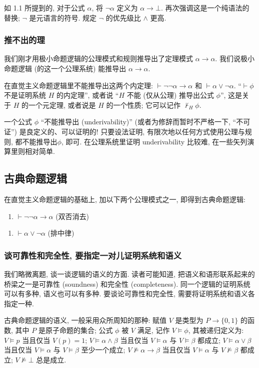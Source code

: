 \documentclass{article}
\def\a{\alpha}
\def\b{\beta}
\begin{document}
如 1.1 所提到的, 对于公式 $\a$, 将 $\neg \a$ 定义为 $\a \to \bot$. 再次强调这是一个纯语法的替换; $\neg$ 是元语言的符号. 规定 $\neg$ 的优先级比 $\land$ 更高.

\subsubsection{推不出的理}

我们刚才用极小命题逻辑的公理模式和规则推导出了定理模式 $\a \to \a$. 我们说极小命题逻辑 (的这一个公理系统) 能推导出 $\a \to \a$. 

在直觉主义命题逻辑里不能推导出这两个内定理: $\vdash \neg \neg \a \to \a$ 和 $\vdash \a \lor \neg \a$. ``$\vdash \phi$ 不是证明系统 $H$ 的内定理'', 或者说 ``$H$ 不能 (仅从公理) 推导出公式 $\phi$'', 这是关于 $H$ 的一个元定理, 或者说是 $H$ 的一个性质; 它可以记作 $\not\vdash_H \phi$. 

一个公式 $\phi$ ``不能推导出 (underivability)'' (或者为修辞而暂时不严格一下, ``不可证'') 是良定义的、可以证明的! 只要设法证明, 有限次地以任何方式使用公理与规则, 都不能推导出$\phi$, 即可. 在公理系统里证明 underivability 比较难, 在一些矢列演算里则相对简单.

\subsection{古典命题逻辑}

在直觉主义命题逻辑的基础上, 加以下两个公理模式之一, 即得到古典命题逻辑:
\begin{enumerate}[start=10]
\item $\vdash \neg \neg \a \to \a$ (双否消去)
\end{enumerate}
\begin{enumerate}[start=10]
\item $\vdash \a \lor \neg \a$ (排中律)
\end{enumerate}

\subsubsection{谈可靠性和完全性, 要指定一对儿证明系统和语义}

我们略微离题, 谈一谈逻辑的语义的方面. 读者可能知道, 把语义和语形联系起来的桥梁之一是可靠性 (soundness) 和完全性 (completeness). 同一个逻辑的证明系统可以有多种, 语义也可以有多种. 要谈论可靠性和完全性, 需要将证明系统和语义各指定一种.

古典命题逻辑的语义, 一般采用众所周知的那种: 赋值 $V$ 是类型为 $P \to \{0,1\}$ 的函数, 其中 $P$ 是原子命题的集合; 公式 $\phi$ 被 $V$ 满足, 记作 $V\models \phi$, 其被递归定义为: $V\models p$ 当且仅当 $V(p)=1$; $V\models \a \land \b$ 当且仅当 $V\models \a$ 与 $V\models \b$ 都成立; $V\models \a \lor \b$ 当且仅当 $V\models \a$ 与 $V\models \b$ 至少一个成立; $V\not\models \a \to \b$ 当且仅当 $V\models \a$ 与 $V\not\models \b$ 都成立; $V\not\models\bot$ 总是成立.
\end{document}
